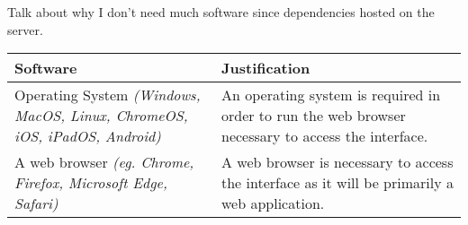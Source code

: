 \documentclass[../../../main.tex]{subfiles}
\begin{document}
Talk about why I don't need much software since dependencies hosted on the server.\\

\begin{tabular}{ |p{}|p{}| }
    \hline
    \textbf{Software}                                                & \textbf{Justification}          \\
    \hline
    Operating System \newline
    \textit{(Windows, MacOS, Linux, ChromeOS, iOS, iPadOS, Android)} &
    An operating system is required in order to run the web browser necessary to access the interface. \\
    \hline
    A web browser \newline
    \textit{(eg. Chrome, Firefox, Microsoft Edge, Safari)}           &
    A web browser is necessary to access the interface as it will be primarily a web application.      \\
    \hline
\end{tabular}
\end{document}
